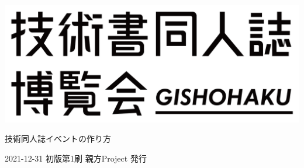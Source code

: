 \clearpage{\thispagestyle{empty}}
\begin{center}

\includegraphics[width=0.75\linewidth]{images/chap-title/logo.png}
\vspace{80pt}

\begin{sffamily}
\Large
技術同人誌イベントの作り方
\normalsize
\end{sffamily}
\vspace{320pt}

\begin{sffamily}
2021-12-31
\hspace{5pt}
初版第1刷
\hspace{5pt}
親方Project
\hspace{5pt}
発行
\end{sffamily}

\end{center}
